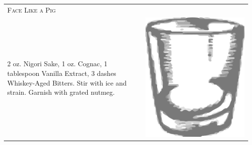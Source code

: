 \documentclass{article}
\begin{document}
\begin{multicols}{2}
\begin{tabular}{p{2in} p{0.5in}}
\multicolumn{2}{p{3in}}{\centering\Huge\textsc{Face Like a Pig}} \\ 
  \vspace{-0.1in}2 oz. Nigori Sake, 1 oz. Cognac, 1 tablespoon Vanilla Extract, 3 dashes Whiskey-Aged Bitters. Stir with ice and strain. Garnish with grated nutmeg. &
  \vspace{-0.1in} \includegraphics{rocks_glass.png}
\end{tabular}


\end{multicols}
\end{document}
